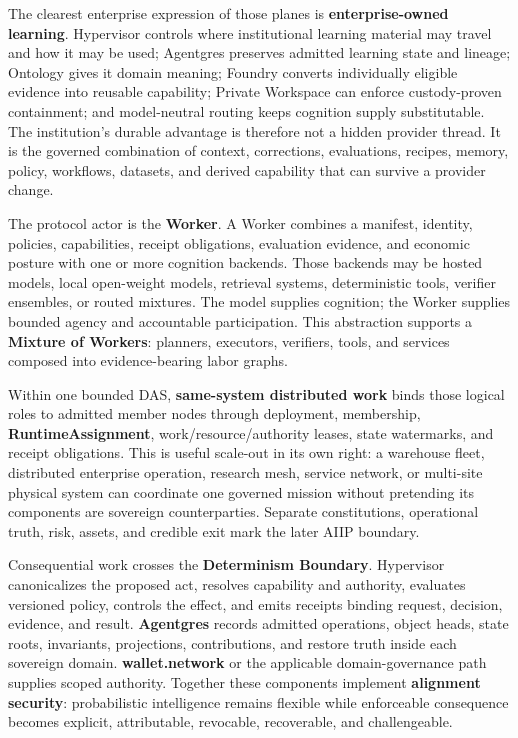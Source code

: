 \documentclass[
  11pt,
]{article}
\begin{document}
The clearest enterprise expression of those planes is \textbf{enterprise-owned
learning}. Hypervisor controls where institutional learning material may travel
and how it may be used; Agentgres preserves admitted learning state and lineage;
Ontology gives it domain meaning; Foundry converts individually eligible
evidence into reusable capability; Private Workspace can enforce
custody-proven containment; and model-neutral routing keeps cognition supply
substitutable. The institution's durable advantage is therefore not a hidden
provider thread. It is the governed combination of context, corrections,
evaluations, recipes, memory, policy, workflows, datasets, and derived
capability that can survive a provider change.

The protocol actor is the \textbf{Worker}. A Worker combines a manifest,
identity, policies, capabilities, receipt obligations, evaluation evidence,
and economic posture with one or more cognition backends. Those backends may
be hosted models, local open-weight models, retrieval systems, deterministic
tools, verifier ensembles, or routed mixtures. The model supplies cognition;
the Worker supplies bounded agency and accountable participation. This
abstraction supports a \textbf{Mixture of Workers}: planners, executors,
verifiers, tools, and services composed into evidence-bearing labor graphs.

Within one bounded DAS, \textbf{same-system distributed work} binds those
logical roles to admitted member nodes through deployment, membership,
\textbf{RuntimeAssignment}, work/resource/authority leases, state watermarks,
and receipt obligations. This is useful scale-out in its own right: a warehouse
fleet, distributed enterprise operation, research mesh, service network, or
multi-site physical system can coordinate one governed mission without
pretending its components are sovereign counterparties. Separate constitutions,
operational truth, risk, assets, and credible exit mark the later AIIP boundary.

Consequential work crosses the \textbf{Determinism Boundary}. Hypervisor
canonicalizes the proposed act, resolves capability and authority, evaluates
versioned policy, controls the effect, and emits receipts binding request,
decision, evidence, and result. \textbf{Agentgres} records admitted operations,
object heads, state roots, invariants, projections, contributions, and restore
truth inside each sovereign domain. \textbf{wallet.network} or the applicable
domain-governance path supplies scoped authority. Together these components
implement \textbf{alignment security}: probabilistic intelligence remains
flexible while enforceable consequence becomes explicit, attributable,
revocable, recoverable, and challengeable.
\end{document}
